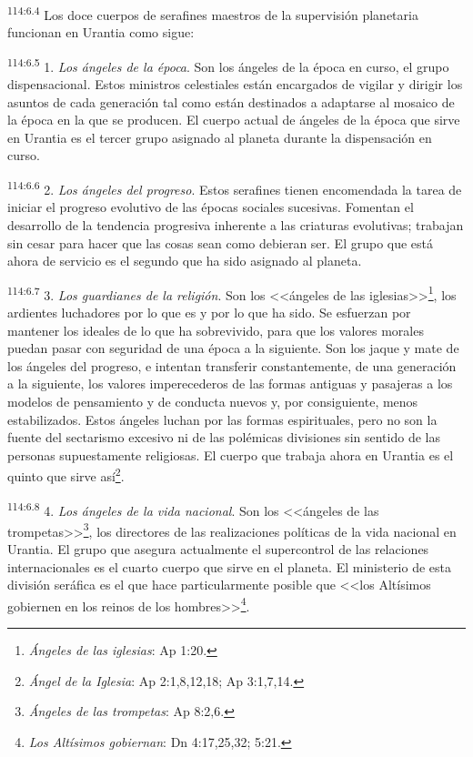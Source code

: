 \documentclass[twoside, 11pt]{book}
\begin{document}
\par
\textsuperscript{114:6.4} Los doce cuerpos de serafines maestros de la supervisión planetaria funcionan en Urantia como sigue:

\par
\textsuperscript{114:6.5} 1. \textit{Los ángeles de la época}. Son los ángeles de la época en curso, el grupo dispensacional. Estos ministros celestiales están encargados de vigilar y dirigir los asuntos de cada generación tal como están destinados a adaptarse al mosaico de la época en la que se producen. El cuerpo actual de ángeles de la época que sirve en Urantia es el tercer grupo asignado al planeta durante la dispensación en curso.

\par
\textsuperscript{114:6.6} 2. \textit{Los ángeles del progreso}. Estos serafines tienen encomendada la tarea de iniciar el progreso evolutivo de las épocas sociales sucesivas. Fomentan el desarrollo de la tendencia progresiva inherente a las criaturas evolutivas; trabajan sin cesar para hacer que las cosas sean como debieran ser. El grupo que está ahora de servicio es el segundo que ha sido asignado al planeta.

\par
\textsuperscript{114:6.7} 3. \textit{Los guardianes de la religión}. Son los <<ángeles de las iglesias>>\footnote{\textit{Ángeles de las iglesias}: Ap 1:20.}, los ardientes luchadores por lo que es y por lo que ha sido. Se esfuerzan por mantener los ideales de lo que ha sobrevivido, para que los valores morales puedan pasar con seguridad de una época a la siguiente. Son los jaque y mate de los ángeles del progreso, e intentan transferir constantemente, de una generación a la siguiente, los valores imperecederos de las formas antiguas y pasajeras a los modelos de pensamiento y de conducta nuevos y, por consiguiente, menos estabilizados. Estos ángeles luchan por las formas espirituales, pero no son la fuente del sectarismo excesivo ni de las polémicas divisiones sin sentido de las personas supuestamente religiosas. El cuerpo que trabaja ahora en Urantia es el quinto que sirve así\footnote{\textit{Ángel de la Iglesia}: Ap 2:1,8,12,18; Ap 3:1,7,14.}.

\par
\textsuperscript{114:6.8} 4. \textit{Los ángeles de la vida nacional}. Son los <<ángeles de las trompetas>>\footnote{\textit{Ángeles de las trompetas}: Ap 8:2,6.}, los directores de las realizaciones políticas de la vida nacional en Urantia. El grupo que asegura actualmente el supercontrol de las relaciones internacionales es el cuarto cuerpo que sirve en el planeta. El ministerio de esta división seráfica es el que hace particularmente posible que <<los Altísimos gobiernen en los reinos de los hombres>>\footnote{\textit{Los Altísimos gobiernan}: Dn 4:17,25,32; 5:21.}.
\end{document}
